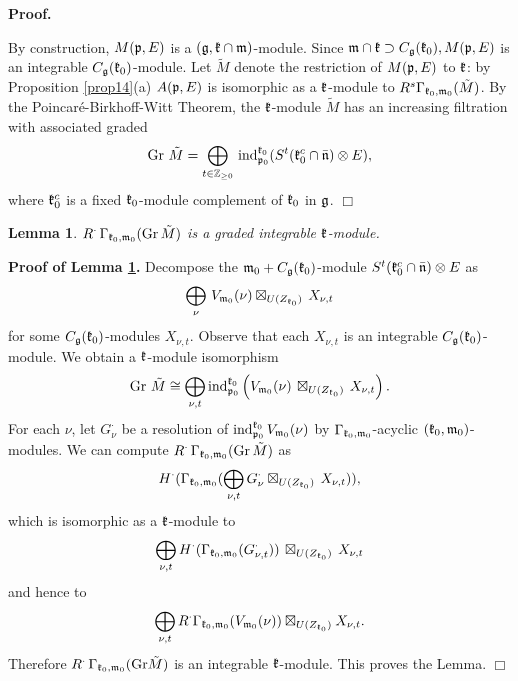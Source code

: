 \documentclass[12pt]{article}
\newcounter{theorem}
\newtheorem{lemma}[theo]{Lemma}
\newenvironment{proof}{ \textbf{Proof.}}{$\Box$}
\newcommand {\ZZ} {\mathbb {Z}}
\newcommand{\kk}{\mathfrak{k}}
\newcommand{\mm}{\mathfrak{m}}
\newcommand{\refle}[1]{Lemma \ref{#1}}
\newcommand{\refprop}[1]{Proposition \ref{#1}}
\newcommand{\qed}{$\Box$}
\newcommand{\Gr}{\mathrm{Gr}}
\begin{document}
\begin{proof}
\item[(a)] By construction, $M(\frak p, E)$ is a $(\frak g,\kk\cap\mm)$-module. Since $\frak m\cap\frak k\supset C_{\frak g} (\frak k_0), M(\frak p,E)$ is an integrable $C_{\frak g} (\frak k_0)$-module. Let $\tilde M$ denote the restriction of $M(\frak p,E)$ to $\frak k$:  by \refprop{prop14}(a)  $A(\frak p, E)$ is isomorphic as a $\frak k$-module to $R^s \Gamma_{\frak k_{0},\frak m_{0}} (\tilde M)$. By the Poincar\'e-Birkhoff-Witt Theorem, the $\frak k$-module $\tilde M$ has an increasing filtration with associated graded
\begin{equation}\label{eq4}
\mathrm{Gr} \,\, \tilde M = \bigoplus\limits_{t\in\ZZ_{\geq 0}}\, \text{ind}^{\frak k_{0}}_{\frak p_{0}} (S^t (\frak k^c_0\cap\bar{\frak n})\otimes E),
\end{equation}
where $\frak k^c_0$ is a fixed $\frak k_0$-module complement of $\frak k_0$ in $\frak g$.
\end{proof}

\begin{lemma}\label{le23}  $R^\cdot \, \Gamma_{\frak k_{0},\frak m_{0}} (\Gr\, \tilde M)$ is a graded integrable $\frak k$-module. \end{lemma}

\textbf{Proof of \refle{le23}.} Decompose the ${\frak m}_0+ C_{\frak g} (\frak k_0)$-module $S^t (\frak k_0^c\cap\bar{\frak n})\otimes E$ as
$$
\bigoplus\limits_\nu \, V_{\frak m_{0}} (\nu) \boxtimes_{U(Z_{\kk_0})} \, X_{\nu,t}
$$
for some $C_{\frak g} (\frak k_0)$-modules $X_{\nu,t}$.  Observe that each $X_{\nu,t}$ is an integrable $C_{\frak g} (\frak k_0)$-module.  We obtain a $\frak k$-module isomorphism
$$
\Gr \,\, \tilde M \cong \bigoplus\limits_{\nu, t} \text{ind}^{\frak k_{0}}_{\frak p_{0}}\left( V_{\frak m_{0}} (\nu) \, \boxtimes_{U(Z_{\kk_0})} \, X_{\nu,t}\right).
$$
For each $\nu$, let $G^{\cdot}_\nu$ be a resolution of $\text{ind}^{\frak k_{0}}_{\frak p_{0}} \, V_{\frak m_{0}} (\nu)$ by $\Gamma_{\frak k_{0},\frak m_{0}}$-acyclic $(\frak k_0,\frak m_0)$-modules.  We can compute $R^\cdot \, \Gamma_{\frak k_{0},\frak m_{0}} (\Gr \, \tilde M)$ as
$$
H^\cdot (\Gamma_{\frak k_{0},\frak m_{0}} (\bigoplus\limits_{\nu,t} G^{\cdot} _\nu \boxtimes_{U(Z_{\kk_0})} \, X_{\nu,t})),
$$
which is isomorphic as a $\frak k$-module to
$$
\bigoplus\limits_{\nu,t} H^\cdot( \Gamma_{\frak k_{0},\frak m_{0}} (G^{\cdot}_{\nu,t}))\, \boxtimes_{U(Z_{\kk_0})} \, X_{\nu,t}
$$
and hence to
\begin{equation}\label{eq5}
\bigoplus\limits_{\nu, t} R^\cdot \Gamma_{\frak k_{0},\frak m_{0}} (V_{\frak m_{0}} (\nu ))\boxtimes_{U(Z_{\kk_0})} X_{\nu,t}.
\end{equation}
Therefore $R^\cdot \, \Gamma_{\frak k_{0},\frak m_{0}}(\Gr \tilde M)$ is an integrable $\frak k$-module.  This proves the Lemma. \qed
\end{document}

